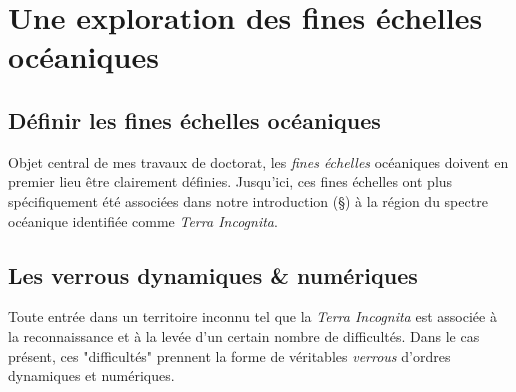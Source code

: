 \color{blue}
\section{Une exploration des fines échelles océaniques}
\subsection{Définir les fines échelles océaniques}
Objet central de mes travaux de doctorat, les \textit{fines échelles} océaniques doivent en premier lieu être clairement définies. Jusqu'ici, ces fines échelles ont plus spécifiquement été associées dans notre introduction (\S {}) à la région du spectre océanique identifiée comme \textit{Terra Incognita}.\\

\color{black}
\noindent{}
\color{black}

\subsection{Les verrous dynamiques \& numériques}
\label{subsection_verrous}
\color{blue}
Toute entrée dans un territoire inconnu tel que la \textit{Terra Incognita} est associée à la reconnaissance et à la levée d'un certain nombre de difficultés. Dans le cas présent, ces "difficultés" prennent la forme de véritables \textit{verrous} d'ordres dynamiques et numériques.
